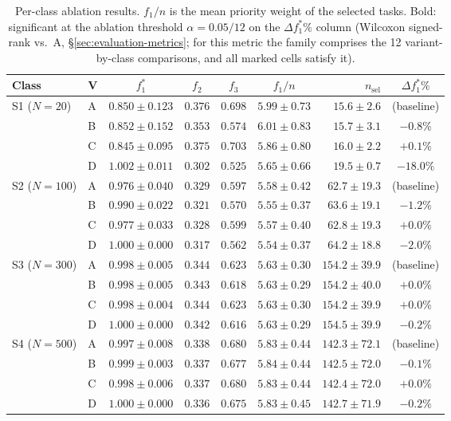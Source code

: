 \begin{table}[H]
\centering
\small
\setlength{\tabcolsep}{2.5pt}
\caption{Per-class ablation results. $f_1/n$ is the mean priority weight of the selected tasks. Bold: significant at the ablation threshold $\alpha=0.05/12$ on the $\Delta f_1^*\%$ column (Wilcoxon signed-rank vs.~A, \S\ref{sec:evaluation-metrics}; for this metric the family comprises the 12 variant-by-class comparisons, and all marked cells satisfy it).}
\label{tab:ablation}
\begin{tabular}{llccccrc}
\toprule
\textbf{Class} & \textbf{V} & \textbf{$f_1^*$} & \textbf{$f_2$} &
\textbf{$f_3$} & \textbf{$f_1/n$} & \textbf{$n_\text{sel}$} &
\textbf{$\Delta f_1^*\%$} \\
\midrule
\multirow{4}{*}{S1 ($N=20$)}
 & A & $0.850 \pm 0.123$ & $0.376$ & $0.698$ & $5.99 \pm 0.73$ &
   $15.6 \pm 2.6$ & (baseline) \\
 & B & $0.852 \pm 0.152$ & $0.353$ & $0.574$ & $6.01 \pm 0.83$ &
   $15.7 \pm 3.1$ & $-0.8\%$ \\
 & C & $0.845 \pm 0.095$ & $0.375$ & $0.703$ & $5.86 \pm 0.80$ &
   $16.0 \pm 2.2$ & $+0.1\%$ \\
 & D & $1.002 \pm 0.011$ & $0.302$ & $0.525$ & $5.65 \pm 0.66$ &
   $19.5 \pm 0.7$ & $\mathbf{-18.0\%}$ \\
\midrule
\multirow{4}{*}{S2 ($N=100$)}
 & A & $0.976 \pm 0.040$ & $0.329$ & $0.597$ & $5.58 \pm 0.42$ &
   $62.7 \pm 19.3$ & (baseline) \\
 & B & $0.990 \pm 0.022$ & $0.321$ & $0.570$ & $5.55 \pm 0.37$ &
   $63.6 \pm 19.1$ & $\mathbf{-1.2\%}$ \\
 & C & $0.977 \pm 0.033$ & $0.328$ & $0.599$ & $5.57 \pm 0.40$ &
   $62.8 \pm 19.3$ & $+0.0\%$ \\
 & D & $1.000 \pm 0.000$ & $0.317$ & $0.562$ & $5.54 \pm 0.37$ &
   $64.2 \pm 18.8$ & $\mathbf{-2.0\%}$ \\
\midrule
\multirow{4}{*}{S3 ($N=300$)}
 & A & $0.998 \pm 0.005$ & $0.344$ & $0.623$ & $5.63 \pm 0.30$ &
   $154.2 \pm 39.9$ & (baseline) \\
 & B & $0.998 \pm 0.005$ & $0.343$ & $0.618$ & $5.63 \pm 0.29$ &
   $154.2 \pm 40.0$ & $+0.0\%$ \\
 & C & $0.998 \pm 0.004$ & $0.344$ & $0.623$ & $5.63 \pm 0.30$ &
   $154.2 \pm 39.9$ & $+0.0\%$ \\
 & D & $1.000 \pm 0.000$ & $0.342$ & $0.616$ & $5.63 \pm 0.29$ &
   $154.5 \pm 39.9$ & $\mathbf{-0.2\%}$ \\
\midrule
\multirow{4}{*}{S4 ($N=500$)}
 & A & $0.997 \pm 0.008$ & $0.338$ & $0.680$ & $5.83 \pm 0.44$ &
   $142.3 \pm 72.1$ & (baseline) \\
 & B & $0.999 \pm 0.003$ & $0.337$ & $0.677$ & $5.84 \pm 0.44$ &
   $142.5 \pm 72.0$ & $-0.1\%$ \\
 & C & $0.998 \pm 0.006$ & $0.337$ & $0.680$ & $5.83 \pm 0.44$ &
   $142.4 \pm 72.0$ & $+0.0\%$ \\
 & D & $1.000 \pm 0.000$ & $0.336$ & $0.675$ & $5.83 \pm 0.45$ &
   $142.7 \pm 71.9$ & $\mathbf{-0.2\%}$ \\
\bottomrule
\end{tabular}
\end{table}

